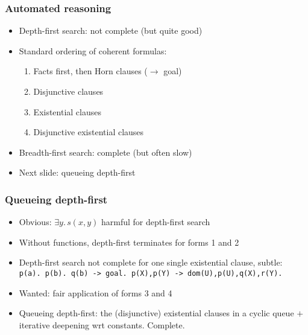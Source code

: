 \documentclass[handout,11pt]{beamer}
\newcommand{\weg}[1]{}
\begin{document}
\weg{
\begin{frame}
\frametitle{Example: DP closed under reflexive closure}
\small
\end{frame}

\frame
  {    
    \frametitle{Search space} \vspace*{-.95in}
    \scalebox{0.40}
      {
    \texttt{[image: tree\_dpe]}
      }
  }
}%

\begin{frame}
\frametitle{Automated reasoning}
 \begin{itemize}[<+->]   %
    \item Depth-first search: not complete (but quite good)
    \item Standard ordering of coherent formulas:
    \begin{enumerate}
       \item Facts first, then Horn clauses ($\to$ goal)
       \item Disjunctive clauses
       \item Existential clauses
       \item Disjunctive existential clauses
    \end{enumerate}
    \item Breadth-first search: complete (but often slow)
    \item Next slide: queueing depth-first
 \end{itemize}
\end{frame}

\begin{frame}
\frametitle{Queueing depth-first}
 \begin{itemize}[<+->]
    \item Obvious: $\exists y.\,s(x,y)$ harmful for depth-first search
    \item Without functions, depth-first terminates for forms 1 and 2
    \item Depth-first search not complete for \alert{one single existential} clause, subtle:
\texttt{  p(a). p(b). q(b) -> goal. p(X),p(Y) -> dom(U),p(U),q(X),r(Y).}
    \item Wanted: fair application of forms 3 and 4 
    \item Queueing depth-first: the (disjunctive) existential clauses
          in a cyclic queue $+$ iterative deepening wrt constants. Complete.
 \end{itemize}
\end{frame}
\end{document}
